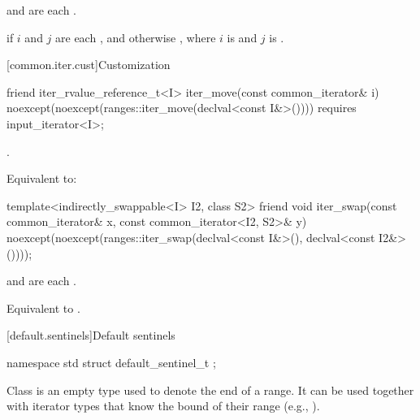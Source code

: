 \begin{itemdescr}
\pnum
\expects
{} and 
are each .

\pnum
\returns
{} if $i$ and $j$ are each , and otherwise
, where
$i$ is  and $j$ is .
\end{itemdescr}

[common.iter.cust]{Customization}

%
\begin{itemdecl}
friend iter_rvalue_reference_t<I> iter_move(const common_iterator& i)
  noexcept(noexcept(ranges::iter_move(declval<const I&>())))
    requires input_iterator<I>;
\end{itemdecl}

\begin{itemdescr}
\pnum
\expects
{}.

\pnum
\effects
Equivalent to: 
\end{itemdescr}

%
\begin{itemdecl}
template<indirectly_swappable<I> I2, class S2>
  friend void iter_swap(const common_iterator& x, const common_iterator<I2, S2>& y)
    noexcept(noexcept(ranges::iter_swap(declval<const I&>(), declval<const I2&>())));
\end{itemdecl}

\begin{itemdescr}
\pnum
\expects
{} and 
are each .

\pnum
\effects
Equivalent to .
\end{itemdescr}

[default.sentinels]{Default sentinels}

%
\begin{itemdecl}
namespace std {
  struct default_sentinel_t { };
}
\end{itemdecl}

\pnum
Class  is an empty type used to denote the end of a
range. It can be used together with iterator types that know the bound
of their range (e.g., ).

